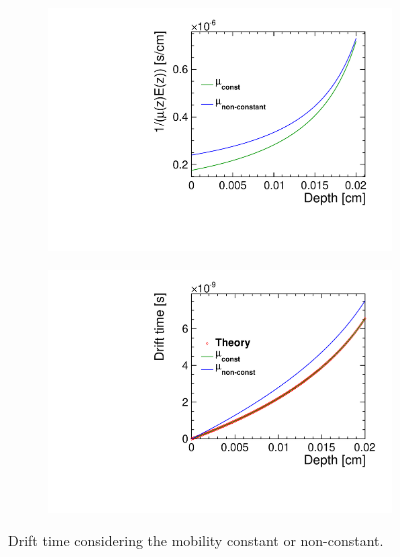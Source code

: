 \begin{figure}[htbp]
  \centering
  \begin{subfigure}[b]{0.49\textwidth}
    \centering
    \includegraphics[width=\textwidth]{figures/ChargeSharing/B06_FunctionToIntegrate.pdf}
    \caption{}\label{fig:}
  \end{subfigure}\hfill
  \begin{subfigure}[b]{0.49\textwidth}
    \centering
    \includegraphics[width=\textwidth]{figures/ChargeSharing/B06_driftTime.pdf}
    \caption{}\label{fig:}
  \end{subfigure} 
  \caption{Drift time considering the mobility constant or non-constant.}\label{fig:}
\end{figure}

